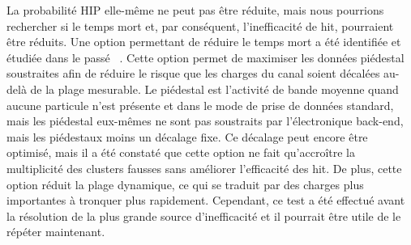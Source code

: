 
La probabilité HIP elle-même ne peut pas être réduite, mais nous pourrions rechercher si le temps mort et, par conséquent, l’inefficacité de hit, pourraient être réduits. Une option permettant de réduire le temps mort a été identifiée et étudiée dans le passé ~\cite{website: hitLoss}. Cette option permet de maximiser les données piédestal soustraites afin de réduire le risque que les charges du canal soient décalées au-delà de la plage mesurable. Le piédestal est l’activité de bande moyenne quand aucune particule n’est présente et dans le mode de prise de données standard, mais les piédestal eux-mêmes ne sont pas soustraits par l’électronique back-end, mais les piédestaux moins un décalage fixe. Ce décalage peut encore être optimisé, mais il a été constaté que cette option ne fait qu’accroître la multiplicité des clusters fausses  sans améliorer l’efficacité des hit. De plus, cette option réduit la plage dynamique, ce qui se traduit par des charges plus importantes à tronquer plus rapidement. Cependant, ce test a été effectué avant la résolution de la plus grande source d’inefficacité et il pourrait être utile de le répéter maintenant.



